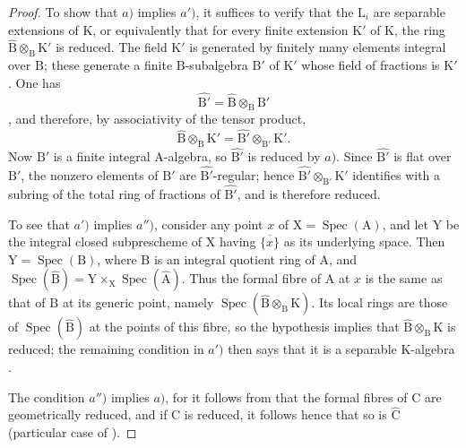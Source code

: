 \begin{proof}

To show that $a)$ implies $a')$, it suffices to verify that the $\mathrm{L}_i$ are separable extensions of $\mathrm{K}$, or equivalently  that for every finite extension $\mathrm{K}'$ of $\mathrm{K}$, the ring $\widehat{\mathrm{B}}\otimes_\mathrm{B}\mathrm{K}'$ is reduced. The field $\mathrm{K}'$ is generated by finitely many elements integral over $\mathrm{B}$; these generate a finite $\mathrm{B}$-subalgebra $\mathrm{B}'$ of $\mathrm{K}'$ whose field of fractions is $\mathrm{K}'$. One has
\[
  \widehat{\mathrm{B}'}=\widehat{\mathrm{B}}\otimes_\mathrm{B}\mathrm{B}'
\]
, and therefore, by associativity of the tensor product,
\[
  \widehat{\mathrm{B}}\otimes_\mathrm{B}\mathrm{K}'
  =\widehat{\mathrm{B}'}\otimes_{\mathrm{B}'}\mathrm{K}'.
\]
Now $\mathrm{B}'$ is a finite integral $\mathrm{A}$-algebra, so $\widehat{\mathrm{B}'}$ is reduced by $a)$. Since $\widehat{\mathrm{B}'}$ is flat over $\mathrm{B}'$, the nonzero elements of $\mathrm{B}'$ are $\widehat{\mathrm{B}'}$-regular; hence $\widehat{\mathrm{B}'}\otimes_{\mathrm{B}'}\mathrm{K}'$ identifies with a subring of the total ring of fractions of $\widehat{\mathrm{B}'}$, and is therefore reduced.

To see that $a')$ implies $a'')$, consider any point $x$ of $\mathrm{X}=\operatorname{Spec}(\mathrm{A})$, and let $\mathrm{Y}$ be the integral closed subprescheme of $\mathrm{X}$ having $\overline{\{x\}}$ as its underlying space. Then $\mathrm{Y}=\operatorname{Spec}(\mathrm{B})$, where $\mathrm{B}$ is an integral quotient ring of $\mathrm{A}$, and $\operatorname{Spec}(\widehat{\mathrm{B}})=\mathrm{Y}\times_\mathrm{X}\operatorname{Spec}(\widehat{\mathrm{A}})$. Thus the formal fibre of $\mathrm{A}$ at $x$ is the same as that of $\mathrm{B}$ at its generic point, namely $\operatorname{Spec}(\widehat{\mathrm{B}}\otimes_\mathrm{B}\mathrm{K})$. Its local rings are those of $\operatorname{Spec}(\widehat{\mathrm{B}})$ at the points of this fibre, so the hypothesis implies that $\widehat{\mathrm{B}}\otimes_\mathrm{B}\mathrm{K}$ is reduced; the remaining condition in $a')$ then says that it is a separable $\mathrm{K}$-algebra .

The condition $a'')$ implies $a)$, for it follows from  that the formal fibres of $\mathrm{C}$ are geometrically reduced, and if $\mathrm{C}$ is reduced, it follows hence that so is $\widehat{\mathrm{C}}$ (particular case of ).


\end{proof}
